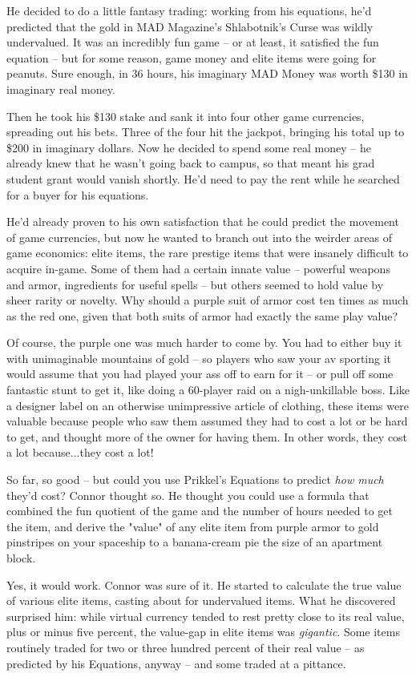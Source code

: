 He decided to do a little fantasy trading: working from his
equations, he'd predicted that the gold in MAD Magazine's
Shlabotnik's Curse was wildly undervalued. It was an incredibly fun
game -- or at least, it satisfied the fun equation -- but for some
reason, game money and elite items were going for peanuts. Sure
enough, in 36 hours, his imaginary MAD Money was worth \$130 in
imaginary real money.

Then he took his \$130 stake and sank it into four other game
currencies, spreading out his bets. Three of the four hit the
jackpot, bringing his total up to \$200 in imaginary dollars. Now
he decided to spend some real money -- he already knew that he
wasn't going back to campus, so that meant his grad student grant
would vanish shortly. He'd need to pay the rent while he searched
for a buyer for his equations.

He'd already proven to his own satisfaction that he could predict
the movement of game currencies, but now he wanted to branch out
into the weirder areas of game economics: elite items, the rare
prestige items that were insanely difficult to acquire in-game.
Some of them had a certain innate value -- powerful weapons and
armor, ingredients for useful spells -- but others seemed to hold
value by sheer rarity or novelty. Why should a purple suit of armor
cost ten times as much as the red one, given that both suits of
armor had exactly the same play value?

Of course, the purple one was much harder to come by. You had to
either buy it with unimaginable mountains of gold -- so players who
saw your av sporting it would assume that you had played your ass
off to earn for it -- or pull off some fantastic stunt to get it,
like doing a 60-player raid on a nigh-unkillable boss. Like a
designer label on an otherwise unimpressive article of clothing,
these items were valuable because people who saw them assumed they
had to cost a lot or be hard to get, and thought more of the owner
for having them. In other words, they cost a lot because...they
cost a lot!

So far, so good -- but could you use Prikkel's Equations to predict
\emph{how much} they'd cost? Connor thought so. He thought you
could use a formula that combined the fun quotient of the game and
the number of hours needed to get the item, and derive the "value"
of any elite item from purple armor to gold pinstripes on your
spaceship to a banana-cream pie the size of an apartment block.

Yes, it would work. Connor was sure of it. He started to calculate
the true value of various elite items, casting about for
undervalued items. What he discovered surprised him: while virtual
currency tended to rest pretty close to its real value, plus or
minus five percent, the value-gap in elite items was
\emph{gigantic}. Some items routinely traded for two or three
hundred percent of their real value -- as predicted by his
Equations, anyway -- and some traded at a pittance.

